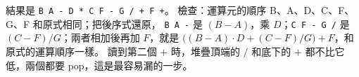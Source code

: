 \begin{pastsoln}
結果是 \texttt{B A - D * C F - G / + F +}。 檢查：運算元的順序 B、A、D、C、F、G、F 和原式相同；把後序式還原，
\texttt{B A -} 是 $(B - A)$，乘 $D$；\texttt{C F - G /} 是 $(C - F)/G$；兩者相加後再加 $F$，就是
$\bigl((B-A) \cdot D + (C-F)/G\bigr) + F$，和原式的運算順序一樣。 讀到第二個 $+$ 時，堆疊頂端的 $/$ 和底下的
$+$ 都不比它低，兩個都要 pop，這是最容易漏的一步。
\end{pastsoln}
